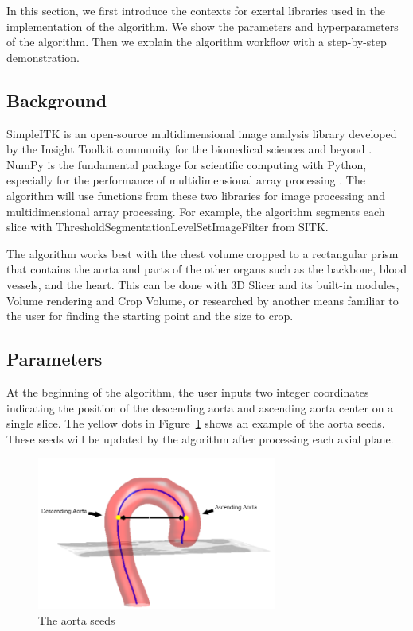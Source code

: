 In this section, we first introduce the contexts for exertal libraries used in the implementation of the algorithm. We show the parameters and hyperparameters of the algorithm. Then we explain the algorithm workflow with a step-by-step demonstration.

\subsection{Background} \label{algo_bg}

SimpleITK is an open-source multidimensional image analysis library developed by the Insight Toolkit community for the biomedical sciences and beyond \cite{JSSv086i08}\cite{10.3389/fninf.2013.00045}. NumPy is the fundamental package for scientific computing with Python, especially for the performance of multidimensional array processing \cite{harris2020array}. The algorithm will use functions from these two libraries for image processing and multidimensional array processing. For example, the algorithm segments each slice with ThresholdSegmentationLevelSetImageFilter from SITK.

The algorithm works best with the chest volume cropped to a rectangular prism that contains the aorta and parts of the other organs such as the backbone, blood vessels, and the heart. This can be done with 3D Slicer and its built-in modules, Volume rendering and Crop Volume, or researched by another means familiar to the user for finding the starting point and the size to crop.

\subsection{Parameters}

At the beginning of the algorithm, the user inputs two integer coordinates indicating the position of the descending aorta and ascending aorta center on a single slice. The yellow dots in Figure~\ref{fig_aorta_seed} shows an example of the aorta seeds. These seeds will be updated by the algorithm after processing each axial plane.

\begin{figure}[ht]
    \centering
    \includegraphics[width=0.7\textwidth]{figures/Sample/Aorta_seeds.png}
    \caption[The Aorta Seeds]{The aorta seeds \citep{6346433}}
    \label{fig_aorta_seed}
\end{figure}

